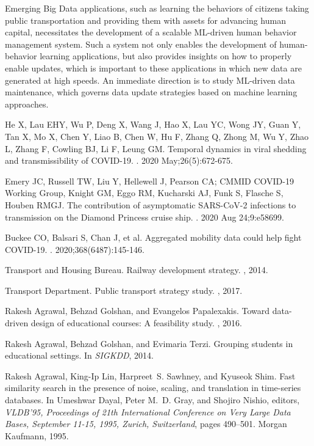 \documentclass[11pt]{article}
\begin{document}
Emerging Big Data applications, such as learning the behaviors of citizens taking public transportation and providing them with assets for advancing human capital, necessitates the development of a scalable ML-driven human behavior management system.  Such a system not only enables the development of human-behavior learning applications, but also provides insights on how to properly enable updates, which is important to these applications in which new data are generated at high speeds. An immediate direction is to study ML-driven data maintenance, which governs data update strategies based on machine learning approaches. 


\begin{thebibliography}{10}
\itemsep=1pt
 \begin{small}
 
 He X, Lau EHY, Wu P, Deng X, Wang J, Hao X, Lau YC, Wong JY, Guan Y, Tan X, Mo X, Chen Y, Liao B, Chen W, Hu F, Zhang Q, Zhong M, Wu Y, Zhao L, Zhang F, Cowling BJ, Li F, Leung GM. 
 \newblock Temporal dynamics in viral shedding and transmissibility of COVID-19. 
 . 2020 May;26(5):672-675.

Emery JC, Russell TW, Liu Y, Hellewell J, Pearson CA; CMMID COVID-19 Working Group, Knight GM, Eggo RM, Kucharski AJ, Funk S, Flasche S, Houben RMGJ. \newblock The contribution of asymptomatic SARS-CoV-2 infections to transmission on the Diamond Princess cruise ship. 
. 2020 Aug 24;9:e58699.

 Buckee CO, Balsari S, Chan J, et al. 
 \newblock Aggregated mobility data could help fight COVID-19. 
 . 2020;368(6487):145‐146.
 
{Transport and Housing Bureau}.
\newblock Railway development strategy.
, 2014.
 
{Transport Department}.
\newblock Public transport strategy study.
, 2017.

Rakesh Agrawal, Behzad Golshan, and Evangelos Papalexakis.
\newblock Toward data-driven design of educational courses: A feasibility
  study.
, 2016.

Rakesh Agrawal, Behzad Golshan, and Evimaria Terzi.
\newblock Grouping students in educational settings.
\newblock In {\em SIGKDD}, 2014.

Rakesh Agrawal, King{-}Ip Lin, Harpreet~S. Sawhney, and Kyuseok Shim.
\newblock Fast similarity search in the presence of noise, scaling, and
  translation in time-series databases.
\newblock In Umeshwar Dayal, Peter M.~D. Gray, and Shojiro Nishio, editors,
  {\em VLDB'95, Proceedings of 21th International Conference on Very Large Data
  Bases, September 11-15, 1995, Zurich, Switzerland}, pages 490--501. Morgan
  Kaufmann, 1995.


\end{small}
\end{thebibliography}
\end{document}
